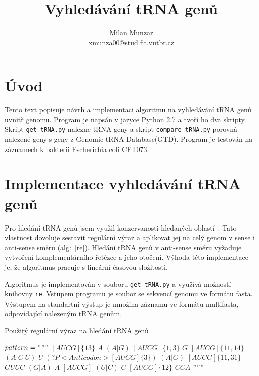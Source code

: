 \documentclass[12pt]{article}
\title{Vyhledávání tRNA genů}
\author{Milan Munzar \\
\normalsize{\href{mailto:xmunza00@stud.fit.vutbr.cz}{xmunza00@stud.fit.vutbr.cz}}}
\date{}
\begin{document}
\maketitle

\section{Úvod}
Tento text popisuje návrh a implementaci algoritmu na vyhledávání tRNA genů uvnitř genomu. Program je napsán v jazyce Python 2.7 a tvoří ho dva skripty. Skript \texttt{get\_tRNA.py} nalezne tRNA geny a skript \texttt{compare\_tRNA.py} porovná nalezené geny s geny z Genomic tRNA Database(GTD). Program je testován na záznamech k bakterii Escherichia coli CFT073.

\section{Implementace vyhledávání tRNA genů}
Pro hledání tRNA genů jsem využil konzervanosti hledaných oblastí~\cite{saks}. Tato vlastnost dovoluje sestavit regulární výraz a aplikovat jej na celý genom v sense i anti-sense směru (alg:~\ref{re}). Hledání tRNA genů v anti-sense směru vyžaduje vytvoření komplementárního řetězce a jeho otočení. Výhoda této implementace je, že algoritmus pracuje s lineární časovou složitosti. 

Algoritmus je implementován v souboru \texttt{get\_tRNA.py} a využívá možností knihovny \texttt{re}. Vstupem programu je soubor se sekvencí genomu ve formátu fasta. Výstupem na standartní výstup je množina záznamů ve formátu multifasta, odpovídající nalezeným tRNA genům.

\begin{algorithm}[H]
\caption{Použitý regulární výraz na hledání tRNA genů}
\label{re}
\begin{algorithmic}[1]
\State $pattern = """$
\State $[AUCG]\{13\}$ \quad {}
\State $A$ \quad {}
\State $(A|G)$ \quad {}
\State $[AUCG]\{1,3\}$ \quad {}
\State $G$ \quad {}
\State $[AUCG]\{11,14\}$ \quad {}
\State $(A|C|U)$ \quad {}
\State $U$ \quad {}
\State $(?P<Anticodon>[AUCG]\{3\})$ \quad {}
\State $(A|G)$ \quad {}
\State $[AUCG]\{11,31\}$ \quad {}
\State $GUUC$ \quad {}
\State $(G|A)$ \quad {}
\State $A$ \quad {}
\State $[AUCG]$ \quad {}
\State $(U|C)$ \quad {}
\State $C$ \quad {}
\State $[AUCG]\{12\}$ \quad {}
\State $CCA$ \quad {}
\State $"""$
\end{algorithmic}
\end{algorithm}  
\end{document}
